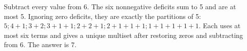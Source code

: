 Subtract every value from 6. The six nonnegative deficits sum to 5 and are at most 5. Ignoring zero deficits, they are exactly the partitions of 5: $5;4+1;3+2;3+1+1;2+2+1;2+1+1+1;1+1+1+1+1$. Each uses at most six terms and gives a unique multiset after restoring zeros and subtracting from 6. The answer is $\boxed7$.
